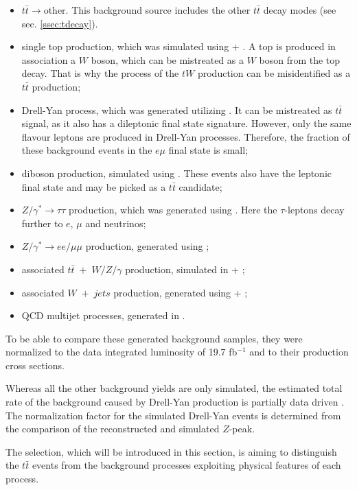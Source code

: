 \begin{itemize}
 \item $t\bar{t}\rightarrow$other. This background source includes the other $t\bar{t}$ decay modes (see sec. \ref{ssec:tdecay}).
 \item single top production, which was simulated using \Powheg + \PYTHIA. A top is produced in association a $W$ boson, which can be 
 mistreated as a $W$ boson from the top decay. That is why the process of the $tW$ production can be misidentified as a $t\bar{t}$ production;
 \item Drell-Yan process, which was generated utilizing \PYTHIA. It can be mistreated as $t\bar{t}$ signal, as it also has a dileptonic
 final state signature. However, only the same flavour leptons are produced in Drell-Yan processes. Therefore, the fraction of these
 background events in the $e\mu$ final state is small;
 \item diboson production, simulated using \PYTHIA. These events also have the leptonic final state and may be picked as a $t\bar{t}$
 candidate;
 \item $Z/\gamma^{*} \rightarrow \tau\tau$ production, which was generated using \PYTHIA. Here the $\tau$-leptons decay further
 to $e$, $\mu$ and neutrinos;
 \item $Z/\gamma^{*} \rightarrow ee/\mu\mu$ production, generated using \PYTHIA;
 \item associated $t\bar{t}\;+\; W/Z/\gamma$ production, simulated in \MG + \PYTHIA;
 \item associated $W\;+\;jets$ production, generated using \MG + \PYTHIA;
 \item QCD multijet processes, generated in \PYTHIA.
\end{itemize}

To be able to compare these generated background samples, they were normalized to the data integrated luminosity of 19.7 fb$^{-1}$ and
to their production cross sections\cite{TWikiXSec}.

Whereas all the other background yields are only simulated, the estimated total rate of the background caused by Drell-Yan production is 
partially data driven \cite{Chatrchyan:2011nb}. The normalization factor for the simulated Drell-Yan events is determined 
from the comparison of the reconstructed and simulated $Z$-peak. 

The selection, which will be introduced in this section, is aiming to distinguish the $t\bar{t}$ events
from the background processes exploiting physical features of each process.

